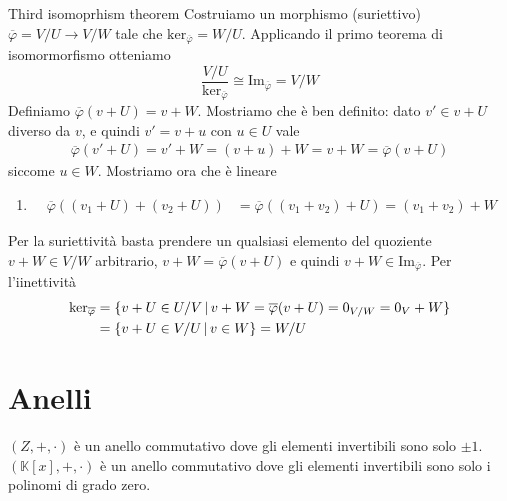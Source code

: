 \documentclass[a4paper]{article}
\begin{document}
\begin{snippetproof}{Third isomoprhism theorem}
    Costruiamo un morphismo (suriettivo) \(\overline{\varphi} = V/U \to V/W\)
    tale che \(\text{ker}_{\overline{\varphi}} = W/U\).
    Applicando il primo teorema di isomormorfismo otteniamo
    \[
        \frac{V/U}{\text{ker}_{\overline{\varphi}}}
        \cong \text{Im}_{\overline{\varphi}} = V/W
    \]
    Definiamo \(\overline{\varphi}(v+U) = v+W\). Mostriamo che è ben definito:
    dato \(v' \in v + U\) diverso da \(v\), e quindi \(v' = v+u\) con
    \(u\in U\) vale
    \begin{align*}
        \overline{\varphi}(v' + U) = v' + W = (v + u) + W
        = v + W = \overline{\varphi}(v + U)
    \end{align*}
    siccome \(u \in W\).
    Mostriamo ora che è lineare
    \begin{enumerate}
        \item
            \begin{align*}
                \overline{\varphi}((v_1 + U) + (v_2 + U))
                &= \overline{\varphi}((v_1 + v_2) + U) = (v_1 + v_2) + W
            \end{align*}
    \end{enumerate}
    Per la suriettività basta prendere un qualsiasi elemento del quoziente
    \(v + W \in V/W\) arbitrario, \(v + W = \overline{\varphi}(v + U)\)
    e quindi \(v + W \in \text{Im}_{\overline{\varphi}}\).
    Per l'iinettività
    \begin{align*}
        \text{ker}_{\overline{\varphi}}
        &= \{
            v + U \in U/V \,|\, v + W = \overline{\varphi}(v + U)
            = 0_{V/W} = 0_V + W
        \} \\
        &= \{
            v + U \in V/U  \,|\, v \in W
        \} = W/U
    \end{align*}
\end{snippetproof}

\section{Anelli}

\((Z, +, \cdot)\) è un anello commutativo dove gli elementi
invertibili sono solo \(\pm 1\). \\
\((\mathbb{K}[x], +, \cdot)\) è un anello commutativo dove gli
elementi invertibili sono solo i polinomi
di grado zero.
\end{document}
